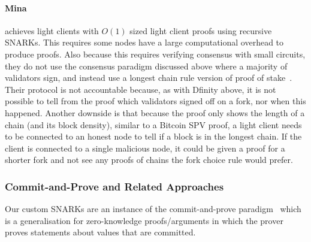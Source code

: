 \paragraph{Mina~\cite{mina}} achieves light clients with $O(1)$ sized light client proofs using recursive SNARKs. This requires some nodes have a large computational overhead to produce proofs. Also because this requires verifying consensus with small circuits, they do not use the consensus paradigm 
discussed above where a majority of validators sign, and instead use a longest chain rule version of proof of stake~\cite{mina}. 
Their protocol is not accountable because, as with Dfinity above, it is not possible to tell from the proof which validators signed off on a fork, nor when this happened. 
Another downside is that because the proof only shows the length of a chain (and its block density), similar to a Bitcoin SPV proof, a light client needs to be 
connected to an honest node to tell if a block is in the longest chain. If the client is connected to a single malicious node, it could be given a proof for a 
shorter fork and not see any proofs of chains the fork choice rule would prefer.
\vspace{-0.03cm}
\subsubsection{Commit-and-Prove and Related Approaches}
\label{sec:commit_prove}

\noindent Our custom SNARKs are an instance of the commit-and-prove paradigm~\cite{KilianPhD,CLOS02,CP_proposal,HP_paper} 
which is a generalisation for zero-knowledge proofs/arguments in which the prover proves statements about values that are committed.\\

\begin{comment}
In practice, commit-and-prove systems (for short, CP) can be used to compress a large data structure and then prove something about its 
content (e.g., polynomial commitments~\cite{KZG_10}, vector commitments~\cite{vector_commitment_1}, accumulators~\cite{first_accumulator}). 
CP schemes can also be used to decouple the publishing of commitments to some data from the proof generation: each of these actions may be 
performed by different parties or entities~\cite{zkp_reference}. Finally, commitments can be used to make different proof systems 
interoperable~\cite{CP_paper,interoperability_2}. Our SNARKs have properties from the first two categories, however we could not 
have simply re-used an existing argument system: by designing custom circuits and SNARKs, we ensured improved efficiency for our use cases. 
\end{comment}
\vspace{-0.1in}

